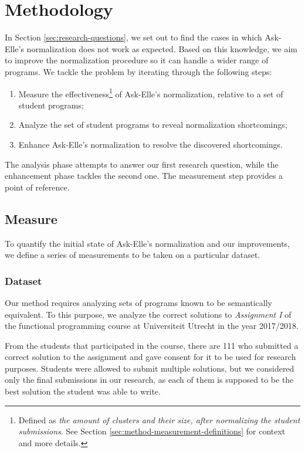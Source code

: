 \chapter{Methodology}
\label{sec:methodology}

In Section \ref{sec:research-questions}, we set out to find the cases in which Ask-Elle's normalization does not work as expected. Based on this knowledge, we aim to improve the normalization procedure so it can handle a wider range of programs. We tackle the problem by iterating through the following steps:

\begin{enumerate}
    \item Measure the effectiveness\footnote{Defined as \emph{the amount of clusters and their size, after normalizing the student submissions}. See Section \ref{sec:method-measurement-definitions} for context and more details.} of Ask-Elle's normalization, relative to a set of student programs;
    \item Analyze the set of student programs to reveal normalization shortcomings;
    \item Enhance Ask-Elle's normalization to resolve the discovered shortcomings.
\end{enumerate}

The analysis phase attempts to answer our first research question, while the enhancement phase tackles the second one. The measurement step provides a point of reference.

\section{Measure}
\label{sec:method-measure}

To quantify the initial state of Ask-Elle's normalization and our improvements, we define a series of measurements to be taken on a particular dataset.

\subsection{Dataset}

Our method requires analyzing sets of programs known to be semantically equivalent. To this purpose, we analyze the correct solutions to \emph{Assignment I} of the functional programming course at Universiteit Utrecht in the year 2017/2018.

From the students that participated in the course, there are 111 who submitted a correct solution to the assignment and gave consent for it to be used for research purposes. Students were allowed to submit multiple solutions, but we considered only the final submissions in our research, as each of them is supposed to be the best solution the student was able to write.

